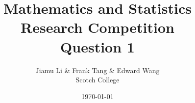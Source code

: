 \usepackage{mathtools, amssymb, amsthm}
\usepackage{parskip}
\usepackage{xcolor}
\usepackage{pgfplotstable}
\pgfplotsset{compat=1.18}
\usepackage{float}
\usepackage{caption}
\usepackage{todonotes}
\usepackage{siunitx}
\usepackage{microtype}
\usepackage[english]{babel}
\usepackage[style=numeric, sorting=none]{biblatex}


\usepackage{bm}
\usepackage{booktabs}
\usepackage{hyperref}
\usepackage{geometry}
\geometry{
  paperwidth=210mm,
  paperheight=297mm,
  textwidth=0.72\paperwidth,
  marginparwidth=2cm,
}
\usepackage{csquotes}


\newtheorem{theorem}{Theorem}[section]
\newtheorem{conj}{Conjecture}[section]
\newtheorem{claim}{Claim}[section]
\newtheorem{lemma}{Lemma}[section]
\theoremstyle{definition}
\newtheorem{definition}{Definition}[section]
\newtheorem*{problem}{Problem}

\DeclarePairedDelimiter\abs{\lvert}{\rvert}
\DeclarePairedDelimiter\floor{\lfloor}{\rfloor}
\DeclarePairedDelimiter\ceil{\lceil}{\rceil}

\usetikzlibrary{automata, arrows, positioning, calc, graphs, graphs.standard}

\title{\bfseries Mathematics and Statistics \\ Research Competition \\ Question 1}
\author{Jiamu Li \& Frank Tang \& Edward Wang \\[1em] Scotch College}
\date{\today}
